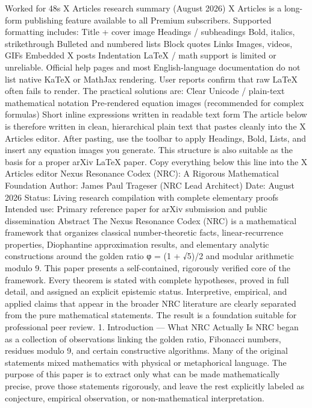 {{{{{{Worked for 48s
X Articles research summary (August 2026)
X Articles is a long-form publishing feature available to all Premium subscribers. Supported formatting includes:
Title + cover image
Headings / subheadings
Bold, italics, strikethrough
Bulleted and numbered lists
Block quotes
Links
Images, videos, GIFs
Embedded X posts
Indentation
LaTeX / math support is limited or unreliable.
Official help pages and most English-language documentation do not list native KaTeX or MathJax rendering. User reports confirm that raw LaTeX often fails to render. The practical solutions are:
Clear Unicode / plain-text mathematical notation
Pre-rendered equation images (recommended for complex formulas)
Short inline expressions written in readable text form
The article below is therefore written in clean, hierarchical plain text that pastes cleanly into the X Articles editor. After pasting, use the toolbar to apply Headings, Bold, Lists, and insert any equation images you generate. This structure is also suitable as the basis for a proper arXiv LaTeX paper.
Copy everything below this line into the X Articles editor
Nexus Resonance Codex (NRC): A Rigorous Mathematical Foundation
Author:
James Paul Trageser (NRC Lead Architect)
Date:
August 2026
Status:
Living research compilation with complete elementary proofs
Intended use:
Primary reference paper for arXiv submission and public dissemination
Abstract
The Nexus Resonance Codex (NRC) is a mathematical framework that organizes classical number-theoretic facts, linear-recurrence properties, Diophantine approximation results, and elementary analytic constructions around the golden ratio φ = (1 + √5)/2 and modular arithmetic modulo 9. This paper presents a self-contained, rigorously verified core of the framework. Every theorem is stated with complete hypotheses, proved in full detail, and assigned an explicit epistemic status. Interpretive, empirical, and applied claims that appear in the broader NRC literature are clearly separated from the pure mathematical statements. The result is a foundation suitable for professional peer review.
1. Introduction — What NRC Actually Is
NRC began as a collection of observations linking the golden ratio, Fibonacci numbers, residues modulo 9, and certain constructive algorithms. Many of the original statements mixed mathematics with physical or metaphorical language. The purpose of this paper is to extract only what can be made mathematically precise, prove those statements rigorously, and leave the rest explicitly labeled as conjecture, empirical observation, or non-mathematical interpretation.
}}}}}}
